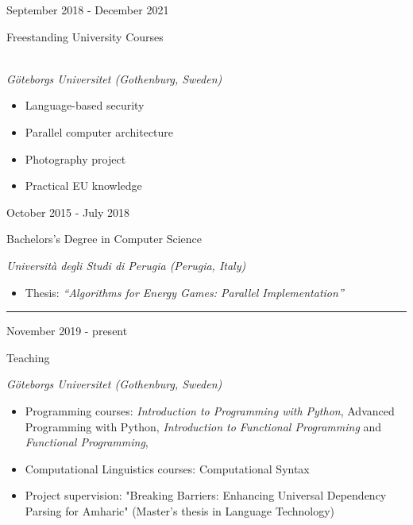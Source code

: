 \documentclass[a4paper,10pt]{article}
\newlength{\cvcolumngapwidth}
\newlength{\cvleftcolumnwidth}
\newlength{\cvrightcolumnwidth}
\newcommand{\cvsectionstyle}[1]{{\normalsize\cvsectionfont\textcolor{cvsectioncolor}{#1}}}
\newcommand{\cvtitlestyle}[1]{{\large\cvtitlefont\textcolor{cvtitlecolor}{#1}}}
\newcommand{\cvdurationstyle}[1]{{\small\cvdurationfont\textcolor{cvdurationcolor}{#1}}}
\newlength{\cvafteritemskipamount}
\newlength{\cvaftersectionskipamount}
\newlength{\cvaftertitleskipamount}
\newlength{\cvparskip}
\newcommand{\cvsection}[1]{
    \begin{minipage}[t]{\cvleftcolumnwidth}
        \raggedleft\cvsectionstyle{#1}
    \end{minipage}%
    \hspace{\cvcolumngapwidth}%
    \begin{minipage}[t]{\cvrightcolumnwidth}
        \textcolor{cvrulecolor}{\rule{\cvrightcolumnwidth}{0.3mm}}
    \end{minipage}

    \vspace{\cvaftersectionskipamount}
}
\newcommand{\cvitem}[2]{
    \begin{minipage}[t]{\cvleftcolumnwidth}
        \raggedleft #1
    \end{minipage}%
    \hspace{\cvcolumngapwidth}%
    \begin{minipage}[t]{\cvrightcolumnwidth}
        \setlength{\parskip}{\cvparskip} #2
    \end{minipage}

    \vspace{\cvafteritemskipamount}
}
\newcommand{\cvtitle}[1]{
    \cvtitlestyle{#1}

    \vspace{\cvaftertitleskipamount}
    \vspace{-\cvparskip}
}
\begin{document}
\cvitem{
    \cvdurationstyle{September 2018 - December 2021}
}{
    \cvtitle{Freestanding University Courses}
    \\
    \textit{Göteborgs Universitet (Gothenburg, Sweden)}
    \begin{itemize}[leftmargin=*]
        \item Language-based security
        \item Parallel computer architecture
        \item Photography project
        \item Practical EU knowledge
    \end{itemize}
}

\cvitem{
    \cvdurationstyle{October 2015 - July 2018}
}{
    \cvtitle{Bachelors's Degree in Computer Science}
    
    \textit{Università degli Studi di Perugia (Perugia, Italy)}

    \begin{itemize}[leftmargin=*]
        \item Thesis: \textit{``Algorithms for Energy Games: Parallel Implementation''}
    \end{itemize}
}


%    


\cvsection{WORK EXPERIENCE}

\cvitem{
    \cvdurationstyle{November 2019 - present}
}{
    \cvtitle{Teaching}

    \textit{Göteborgs Universitet (Gothenburg, Sweden)} \
    \begin{itemize}[leftmargin=*]
    \item Programming courses: \textit{Introduction to Programming with Python}, {Advanced Programming with Python}, \textit{Introduction to Functional Programming} and \textit{Functional Programming},
    \item Computational Linguistics courses: Computational Syntax
    \item Project supervision: "Breaking Barriers: Enhancing Universal Dependency Parsing for Amharic" (Master's thesis in Language Technology)
    \end{itemize}
}
\end{document}
